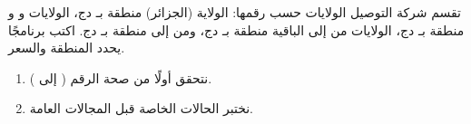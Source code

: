 \begin{statement}
تقسم شركة التوصيل الولايات حسب رقمها: الولاية  (الجزائر) منطقة  بـ  دج، الولايات  و و منطقة  بـ  دج، الولايات من  إلى  الباقية منطقة  بـ  دج، ومن  إلى  منطقة  بـ  دج. اكتب برنامجًا يحدد المنطقة والسعر.
\end{statement}
\begin{stepsbox}\begin{enumerate}
\item نتحقق أولًا من صحة الرقم ( إلى ).
\item نختبر الحالات الخاصة قبل المجالات العامة.
\end{enumerate}\end{stepsbox}
